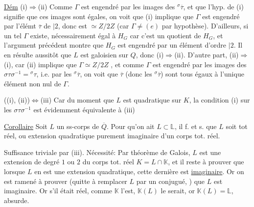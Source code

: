 \uline{Dém} (i)$\Rightarrow$(ii) Comme $\Gamma$ est engendré par les images  des ${}^{\sigma}\overline\tau$,  et que l'hyp. de (i) signifie que ces images sont égales, on voit que (i) implique que $\Gamma$ est engendré par l'élémt $\overline\tau$ de  $|2$, donc est $\simeq Z/2Z$ (car $\Gamma\ne(e)$ par hypothèse). D'ailleurs, si un tel $\Gamma$ existe,   nécessairement égal à $H_G$ car  c'est un quotient de $H_G$, et l'argument précédent montre que  $H_G$ est engendré par un élément d'ordre $|2$.   Il en résulte aussitôt que $L$ est galoisien sur $Q$, donc (i)$\Rightarrow$(ii). D'autre part, (ii)$\Rightarrow$(i), car (ii) implique que $\Gamma\simeq Z/2Z$ , et comme $\Gamma$ est engendré par les images des $\sigma\tau\sigma^{-1}={}^{\sigma}\tau$, i.e. par les ${}^{\sigma}\overline\tau$, on voit que $\overline\tau$ (donc les ${}^{\sigma}\overline\tau$) sont tous égaux à l'unique élément non nul de $\Gamma$.

((i), (ii))$\Longleftrightarrow$(iii) Car du moment que $L$ est quadratique sur $K$, la condition (i) sur les $\sigma\tau\sigma^{-1}$ est évidemment équivalente à (iii)

\uline{Corollaire} Soit $L$ un ss-corps de $\overline Q$. Pour qu'on ait $L\subset\mathbb L$, il f. et s. que $L$ soit tot réel, ou extension quadratique purement imaginaire d'un corps tot. réel.

Suffisance triviale par (iii). Nécessité: Par théorème de Galois, $L$ est une extension de degré $1$ ou $2$ du corps tot. réel $K=L\cap\mathbb K$, et il reste à prouver que lorsque $L$ en est une extension quadratique, cette dernière est  \uline{imaginaire}.
 Or  on est ramené à prouver
(quitte à remplacer $L$ par un conjugué, ) que $L$ est imaginaire. Or s'il était réel, comme $\mathbb K$ l'est, $\mathbb K(L)$ le serait, or $\mathbb K(L)=\mathbb L$, absurde.

